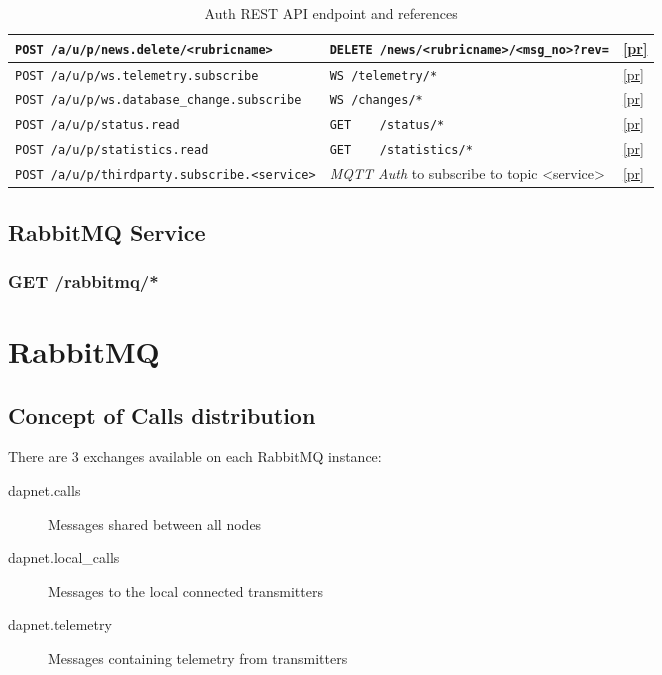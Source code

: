 \begin{table}[htbp]
\begin{tabular}{|l|l|l|}
    \verb|POST /a/u/p/news.delete/<rubricname>| & \verb|DELETE /news/<rubricname>/<msg_no>?rev=| & \ref{pr} \\ \hline
    \hline
    \verb|POST /a/u/p/ws.telemetry.subscribe|       & \verb|WS /telemetry/*| & \ref{pr} \\ 
    \verb|POST /a/u/p/ws.database_change.subscribe| & \verb|WS /changes/*|   & \ref{pr} \\ \hline
    \hline    
    \verb|POST /a/u/p/status.read|     & \verb|GET    /status/*|     & \ref{pr} \\ \hline
    \verb|POST /a/u/p/statistics.read| & \verb|GET    /statistics/*| & \ref{pr} \\ \hline
    \hline
    \verb|POST /a/u/p/thirdparty.subscribe.<service>| & \textit{MQTT Auth} to subscribe to topic <service> & \ref{pr} \\
    \hline
  \end{tabular}
  \caption{Auth REST API endpoint and references}
\end{table}

\newpage

\subsection{RabbitMQ Service}
\label{protocoldef:RabbitMQ}

\subsubsection{GET /rabbitmq/*}


\section{RabbitMQ}
\label{protocoldef:RabbitMQ}

\subsection{Concept of Calls distribution}
\label{protocoldef:RabbitMQ:calldistribution}

There are 3 exchanges available on each RabbitMQ instance:
\begin{description}
\item[dapnet.calls] Messages shared between all nodes
\item[dapnet.local\_calls] Messages to the local connected transmitters
\item[dapnet.telemetry] Messages containing telemetry from transmitters
\end{description}

